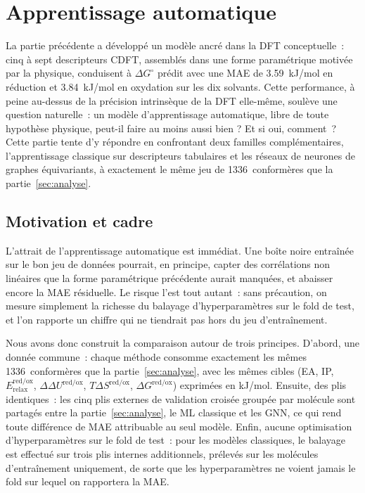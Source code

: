 \section{Apprentissage automatique}
\label{sec:ml}

La partie précédente a développé un modèle ancré dans la DFT conceptuelle~: cinq à sept descripteurs CDFT, assemblés dans une forme paramétrique motivée par la physique, conduisent à $\Delta G^\circ$ prédit avec une MAE de \SI{3.59}{kJ/mol} en réduction et \SI{3.84}{kJ/mol} en oxydation sur les dix solvants. Cette performance, à peine au-dessus de la précision intrinsèque de la DFT elle-même, soulève une question naturelle~: un modèle d'apprentissage automatique, libre de toute hypothèse physique, peut-il faire au moins aussi bien ? Et si oui, comment~? Cette partie tente d'y répondre en confrontant deux familles complémentaires, l'apprentissage classique sur descripteurs tabulaires et les réseaux de neurones de graphes équivariants, à exactement le même jeu de 1336~conformères que la partie~\ref{sec:analyse}.

\subsection{Motivation et cadre}
\label{sec:ml_motivation}

L'attrait de l'apprentissage automatique est immédiat. Une boîte noire entraînée sur le bon jeu de données pourrait, en principe, capter des corrélations non linéaires que la forme paramétrique précédente aurait manquées, et abaisser encore la MAE résiduelle. Le risque l'est tout autant~: sans précaution, on mesure simplement la richesse du balayage d'hyperparamètres sur le fold de test, et l'on rapporte un chiffre qui ne tiendrait pas hors du jeu d'entraînement.

Nous avons donc construit la comparaison autour de trois principes. D'abord, une donnée commune~: chaque méthode consomme exactement les mêmes 1336~conformères que la partie~\ref{sec:analyse}, avec les mêmes cibles (EA, IP, $E_\text{relax}^\text{red/ox}$, $\Delta\Delta U^\text{red/ox}$, $T\Delta S^\text{red/ox}$, $\Delta G^\text{red/ox}$) exprimées en kJ/mol. Ensuite, des plis identiques~: les cinq plis externes de validation croisée groupée par molécule sont partagés entre la partie~\ref{sec:analyse}, le ML classique et les GNN, ce qui rend toute différence de MAE attribuable au seul modèle. Enfin, aucune optimisation d'hyperparamètres sur le fold de test~: pour les modèles classiques, le balayage est effectué sur trois plis internes additionnels, prélevés sur les molécules d'entraînement uniquement, de sorte que les hyperparamètres ne voient jamais le fold sur lequel on rapportera la MAE.

